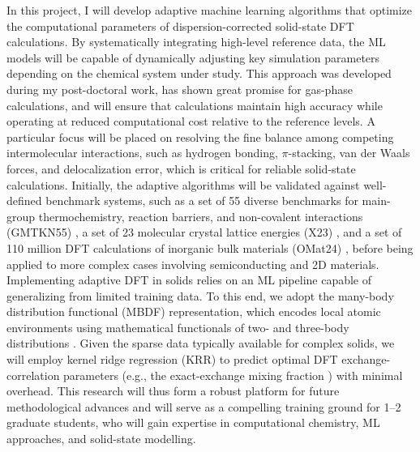 \documentclass[11pt,english,calcwidth,compact]{nserc-appendix}
\begin{document}
In this project, I will develop adaptive machine learning algorithms that optimize the computational parameters of dispersion-corrected solid-state DFT calculations. By systematically integrating high-level reference data, the ML models will be capable of dynamically adjusting key simulation parameters depending on the chemical system under study. This approach was developed during my post-doctoral work, has shown great promise for gas-phase calculations, and will ensure that calculations maintain high accuracy while operating at reduced computational cost relative to the reference levels. A particular focus will be placed on resolving the fine balance among competing intermolecular interactions, such as hydrogen bonding, $\pi$-stacking, van der Waals forces, and delocalization error, which is critical for reliable solid-state calculations. Initially, the adaptive algorithms will be validated against well-defined benchmark systems, such as a set of 55 diverse benchmarks for main-group thermochemistry, reaction barriers, and non-covalent interactions (GMTKN55) \cite{gmtkn55}, a set of 23 molecular crystal lattice energies (X23) \cite{x23,x23b}, and a set of 110 million DFT calculations 
of inorganic bulk materials (OMat24) \cite{omat24}, before being applied to more complex cases involving semiconducting and 2D materials. 
Implementing adaptive DFT in solids relies on an ML pipeline capable of generalizing from limited training data. To this end, we adopt the many-body distribution functional (MBDF) representation, which encodes local atomic environments using mathematical functionals of two- and three-body distributions \cite{mbdf,cmbdf}. Given the sparse data typically available for complex solids, we will employ kernel ridge regression (KRR) \cite{vapnik1999nature,rasmussen2006gaussian, GPR_deringer} to predict optimal DFT exchange-correlation parameters (e.g., the exact-exchange mixing fraction \cite{apbe0}) with minimal overhead. 
This research will thus form a robust platform for future methodological advances and will serve as a compelling training ground for 1–2 graduate students, who will gain expertise in computational chemistry, ML approaches, and solid-state modelling.
\end{document}
